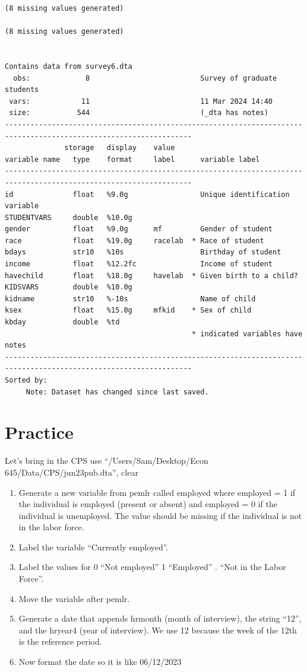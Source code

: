\documentclass[
]{book}
\providecommand{\tightlist}{%
  \setlength{\itemsep}{0pt}\setlength{\parskip}{0pt}}
\begin{document}
\begin{verbatim}
(8 missing values generated)

(8 missing values generated)


Contains data from survey6.dta
  obs:             8                          Survey of graduate students
 vars:            11                          11 Mar 2024 14:40
 size:           544                          (_dta has notes)
------------------------------------------------------------------------------------------------------------------
              storage   display    value
variable name   type    format     label      variable label
------------------------------------------------------------------------------------------------------------------
id              float   %9.0g                 Unique identification variable
STUDENTVARS     double  %10.0g                
gender          float   %9.0g      mf         Gender of student
race            float   %19.0g     racelab  * Race of student
bdays           str10   %10s                  Birthday of student
income          float   %12.2fc               Income of student
havechild       float   %18.0g     havelab  * Given birth to a child?
KIDSVARS        double  %10.0g                
kidname         str10   %-10s                 Name of child
ksex            float   %15.0g     mfkid    * Sex of child
kbday           double  %td                   
                                            * indicated variables have notes
------------------------------------------------------------------------------------------------------------------
Sorted by: 
     Note: Dataset has changed since last saved.
\end{verbatim}

\section{Practice}\label{practice}

Let's bring in the CPS
use ``/Users/Sam/Desktop/Econ 645/Data/CPS/jun23pub.dta'', clear

\begin{enumerate}
\def\labelenumi{\arabic{enumi}.}
\tightlist
\item
  Generate a new variable from pemlr called employed where employed = 1 if the individual is employed (present or absent) and employed = 0 if the individual is unemployed. The value should be missing if the individual is not in the labor force.
\item
  Label the variable ``Currently employed''.
\item
  Label the values for 0 ``Not employed'' 1 ``Employed'' . ``Not in the Labor Force''.
\item
  Move the variable after pemlr.
\item
  Generate a date that appends hrmonth (month of interview), the string ``12'', and the hryear4 (year of interview). We use 12 because the week of the 12th is the reference period.
\item
  Now format the date so it is like 06/12/2023
\end{enumerate}
\end{document}
